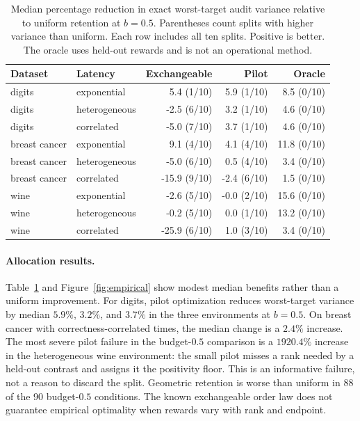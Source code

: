 \documentclass[12pt]{clear2027}
\begin{document}
\begin{table}[t]
\centering\small
\caption{Median percentage reduction in exact worst-target audit variance relative to uniform retention at $b=0.5$. Parentheses count splits with higher variance than uniform. Each row includes all ten splits. Positive is better. The oracle uses held-out rewards and is not an operational method.}
\label{tab:results}
\begin{tabular}{llrrr}\toprule
Dataset & Latency & Exchangeable & Pilot & Oracle\\\midrule
digits & exponential & 5.4 (1/10) & 5.9 (1/10) & 8.5 (0/10) \\
digits & heterogeneous & -2.5 (6/10) & 3.2 (1/10) & 4.6 (0/10) \\
digits & correlated & -5.0 (7/10) & 3.7 (1/10) & 4.6 (0/10) \\
breast cancer & exponential & 9.1 (4/10) & 4.1 (4/10) & 11.8 (0/10) \\
breast cancer & heterogeneous & -5.0 (6/10) & 0.5 (4/10) & 3.4 (0/10) \\
breast cancer & correlated & -15.9 (9/10) & -2.4 (6/10) & 1.5 (0/10) \\
wine & exponential & -2.6 (5/10) & -0.0 (2/10) & 15.6 (0/10) \\
wine & heterogeneous & -0.2 (5/10) & 0.0 (1/10) & 13.2 (0/10) \\
wine & correlated & -25.9 (6/10) & 1.0 (3/10) & 3.4 (0/10) \\

\bottomrule\end{tabular}
\end{table}

\paragraph{Allocation results.}
Table~\ref{tab:results} and Figure~\ref{fig:empirical} show modest median benefits rather than a uniform improvement. For digits, pilot optimization reduces worst-target variance by median $5.9\%$, $3.2\%$, and $3.7\%$ in the three environments at $b=0.5$. On breast cancer with correctness-correlated times, the median change is a $2.4\%$ increase. The most severe pilot failure in the budget-$0.5$ comparison is a $1920.4\%$ increase in the heterogeneous wine environment: the small pilot misses a rank needed by a held-out contrast and assigns it the positivity floor. This is an informative failure, not a reason to discard the split. Geometric retention is worse than uniform in 88 of the 90 budget-$0.5$ conditions. The known exchangeable order law does not guarantee empirical optimality when rewards vary with rank and endpoint.
\end{document}
